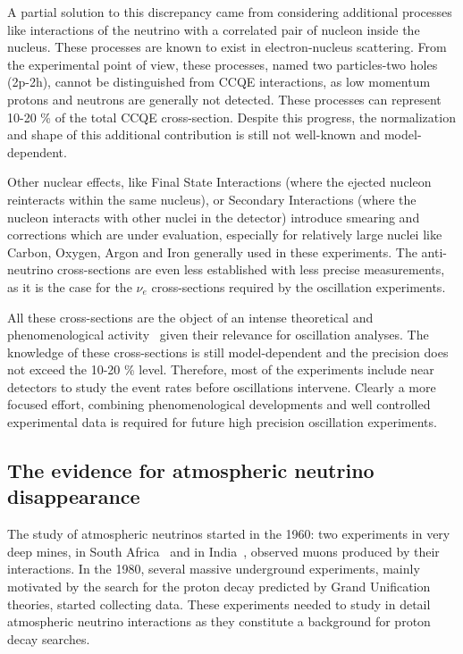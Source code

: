 A partial solution to this discrepancy came from considering additional processes like interactions of the neutrino with a correlated pair of nucleon inside the nucleus. These processes are known to exist in electron-nucleus scattering. From the experimental point of view, these processes, named two particles-two holes (2p-2h), cannot be distinguished from CCQE interactions, as low momentum protons and neutrons are generally not detected. These processes can represent 10-20 \% of the total CCQE cross-section. Despite this progress, the normalization and shape of this additional contribution is still not well-known and model-dependent.

Other nuclear effects, like Final State Interactions (where the ejected nucleon reinteracts within the same nucleus), or Secondary Interactions (where the nucleon interacts with other nuclei in the detector) introduce smearing and corrections which are under evaluation, especially for relatively large nuclei like Carbon, Oxygen, Argon and Iron generally used in these experiments. 
The anti-neutrino cross-sections are even less established with less precise measurements, as it is the case for the $\nu_e$ cross-sections required by the oscillation experiments.  

All these cross-sections are the object of an intense theoretical and phenomenological activity~\cite{zeller,martini} given their relevance for oscillation analyses. The knowledge of these cross-sections is still model-dependent and the precision does not exceed the 10-20 \% level. Therefore, most of the experiments include near detectors to study the event rates before oscillations intervene. Clearly a more focused effort, combining phenomenological developments and well controlled experimental data is required for future high precision oscillation experiments.


\subsection{The evidence for atmospheric neutrino disappearance}
\label{subsec:atmevidence}

The study of atmospheric neutrinos started in the 1960: two experiments in very deep mines, in South Africa~\cite{Reines:1965qk} and in India~\cite{Achar:1965ova}, observed muons produced by their interactions. 
In the 1980, several massive underground experiments, mainly motivated by the search for the proton decay predicted by Grand Unification theories, started collecting data. These experiments needed to study in detail atmospheric neutrino interactions as they constitute a background for proton decay searches.

